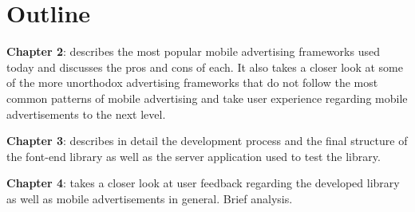 \section{Outline}
\noindent \textbf{Chapter 2}: describes the most popular mobile advertising frameworks used today and discusses the pros and cons of each. It also takes a closer look at some of the more unorthodox advertising frameworks that do not follow the most common patterns of mobile advertising and take user experience regarding mobile advertisements to the next level.

\noindent \textbf{Chapter 3}: describes in detail the development process and the final structure of the font-end library as well as the server application used to test the library.

\noindent \textbf{Chapter 4}: takes a closer look at user feedback regarding the developed library as well as mobile advertisements in general. Brief analysis.